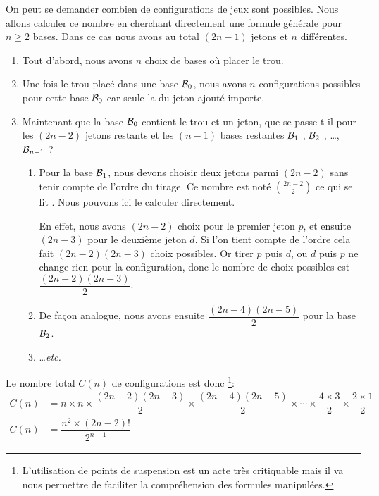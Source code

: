 On peut se demander combien de configurations de jeux sont possibles. Nous allons calculer ce nombre en cherchant directement une formule générale pour $n \geqslant 2$ bases. Dans ce cas nous avons au total $(2n - 1)$ jetons et $n$  différentes.

\begin{enumerate}
	\item Tout d'abord, nous avons $n$ choix de bases où placer le trou.

	\item Une fois le trou placé dans une base ${\cal B}_0$, nous avons $n$ configurations possibles pour cette base ${\cal B}_0$ car seule la  du jeton ajouté importe.

	\item Maintenant que la base ${\cal B}_0$ contient le trou et un jeton, que se passe-t-il pour les $(2n - 2)$ jetons restants et les $(n - 1)$ bases restantes ${\cal B}_1$ , ${\cal B}_2$ , \dots ,  ${\cal B}_{n - 1}$ ?
	
	\begin{enumerate}
		\item Pour la base ${\cal B}_1$, nous devons choisir deux jetons parmi $(2n - 2)$ sans tenir compte de l'ordre du tirage. Ce nombre est noté $\binom{2n - 2}{2}$ ce qui se lit . Nous pouvons ici le calculer directement.
		
		En effet, nous avons $(2n - 2)$ choix pour le premier jeton $p$, et ensuite $(2n - 3)$ pour le deuxième jeton $d$. Si l'on tient compte de l'ordre cela fait $(2n - 2)(2n - 3)$ choix possibles. Or tirer $p$ puis $d$, ou $d$ puis $p$ ne change rien pour la configuration, donc le nombre de choix possibles est $\dfrac{(2n - 2)(2n - 3)}{2}$.
		
		\item De façon analogue, nous avons ensuite $\dfrac{(2n - 4)(2n - 5)}{2}$ pour la base ${\cal B}_2$.
		
		\item \dots \textit{etc.}
	\end{enumerate}
\end{enumerate}

Le nombre total $C(n)$ de configurations est donc 
\footnote{
	L'utilisation de points de suspension est un acte très critiquable mais il va nous permettre de faciliter la compréhension des formules manipulées.
}:
\begin{align*}
	C(n)
	  & = n
	      \times n 
	      \times \dfrac{(2n - 2)(2n - 3)}{2} 
	      \times \dfrac{(2n - 4)(2n - 5)}{2} 
	      \times \cdots 
	      \times \dfrac{4 \times 3}{2}
	      \times \dfrac{2 \times 1}{2}
	\\
	C(n)
	  & = \dfrac{n^2 \times (2n - 2)!}{2^{n-1}}
\end{align*}

